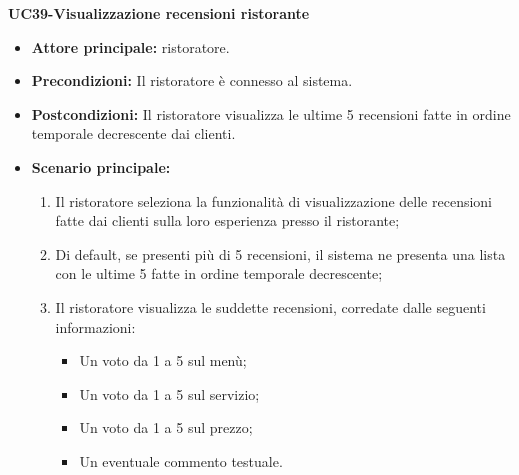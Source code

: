 \textbf{UC39-Visualizzazione recensioni ristorante}
\begin{itemize}
\item \textbf{Attore principale:} ristoratore.
\item \textbf{Precondizioni:} Il ristoratore è connesso al sistema.
\item \textbf{Postcondizioni:} Il ristoratore visualizza le ultime 5 recensioni fatte in ordine temporale decrescente dai clienti.
\item \textbf{Scenario principale:}
\begin{enumerate}
    \item Il ristoratore seleziona la funzionalità di visualizzazione delle recensioni fatte dai clienti sulla loro esperienza presso il ristorante;
    \item Di default, se presenti più di 5 recensioni, il sistema ne presenta una lista con le ultime 5 fatte in ordine temporale decrescente;
    \item Il ristoratore visualizza le suddette recensioni, corredate dalle seguenti informazioni:
    \begin{itemize}
        \item Un voto da 1 a 5 sul menù;
        \item Un voto da 1 a 5 sul servizio;
        \item Un voto da 1 a 5 sul prezzo;
        \item Un eventuale commento testuale.
    \end{itemize}
\end{enumerate}
\end{itemize}

